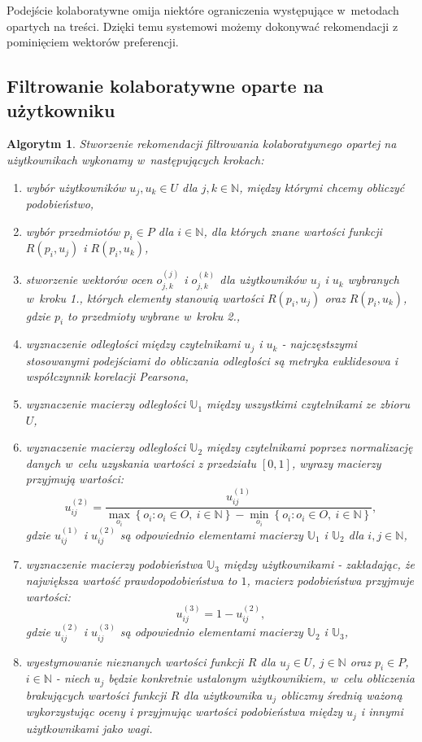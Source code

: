 \documentclass[12pt,a4paper]{report}
\newtheorem{algorytm}[df]{Algorytm}
\newcommand{\set}[1]{\left\lbrace {#1} \right\rbrace}
\newcommand{\setN}{\mathbb{N}}
\newcommand{\setUzytkownicy}{\mathit{U}}
\newcommand{\setPrzedmioty}{\mathit{P}}
\newcommand{\setOceny}{\mathit{O}}
\begin{document}
Podejście kolaboratywne omija niektóre ograniczenia występujące w~metodach opartych na treści. Dzięki temu systemowi możemy dokonywać rekomendacji z pominięciem wektorów preferencji. 

\subsection{Filtrowanie kolaboratywne oparte na użytkowniku}

\begin{algorytm}
Stworzenie rekomendacji filtrowania kolaboratywnego opartej na użytkownikach wykonamy w~następujących krokach:
\begin{enumerate}
\item wybór użytkowników $u_j, u_k \in \setUzytkownicy$ dla $j,k \in \setN$, między którymi chcemy obliczyć podobieństwo,
\item wybór przedmiotów $p_i \in \setPrzedmioty$ dla $i \in \setN$, dla których znane wartości funkcji $R(p_i,u_j)$ i $R(p_i,u_k)$,
\item stworzenie wektorów ocen $o_{j,k}^{(j)}$ i $o_{j,k}^{(k)}$ dla użytkowników $u_j$ i $u_k$ wybranych w~kroku 1., których elementy stanowią wartości $R(p_i,u_j)$ oraz $R(p_i,u_k)$, gdzie $p_i$ to przedmioty wybrane w~kroku 2.,
\item wyznaczenie odległości między czytelnikami $u_j$ i $u_k$ - najczęstszymi stosowanymi podejściami do obliczania odległości są metryka euklidesowa i współczynnik korelacji Pearsona,
\item wyznaczenie macierzy odległości $\mathbb{U}_1$ między wszystkimi czytelnikami ze zbioru $\setUzytkownicy$,
\item wyznaczenie macierzy odległości $\mathbb{U}_2$ między czytelnikami poprzez normalizację danych w~celu uzyskania wartości z przedziału $[0,1]$, wyrazy macierzy przyjmują wartości:
$$
u_{ij}^{(2)} = \frac{u_{ij}^{(1)}}{\max_{o_i} \set{o_i : o_i \in \setOceny,\: i \in \setN } - \min_{o_i} \set{o_i : o_i \in \setOceny, \: i \in \setN}},
$$
gdzie $u_{ij}^{(1)}$ i $u_{ij}^{(2)}$ są odpowiednio elementami macierzy $\mathbb{U}_1$ i $\mathbb{U}_2$ dla $i,j \in \setN$,
\item wyznaczenie macierzy podobieństwa $\mathbb{U}_3$ między użytkownikami - zakładając, że największa wartość prawdopodobieństwa to $1$, macierz podobieństwa przyjmuje wartości:
$$
u_{ij}^{(3)} = 1 - u_{ij}^{(2)},
$$
gdzie $u_{ij}^{(2)}$ i $u_{ij}^{(3)}$ są odpowiednio elementami macierzy $\mathbb{U}_2$ i $\mathbb{U}_3$,
\item wyestymowanie nieznanych wartości funkcji $R$ dla $u_j \in \setUzytkownicy$, $j \in \setN$ oraz $p_i \in \setPrzedmioty$, $i \in \setN$  - niech $u_j$ będzie konkretnie ustalonym użytkownikiem, w~celu obliczenia brakujących wartości funkcji $R$ dla użytkownika $u_j$ obliczmy średnią ważoną wykorzystując oceny i przyjmując wartości podobieństwa między $u_j$ i innymi użytkownikami jako wagi.
\end{enumerate}
\end{algorytm}
\end{document}
